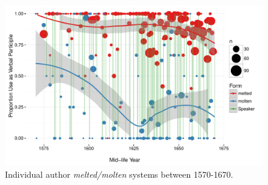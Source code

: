 \documentclass{artikel3}
\begin{document}
\begin{figure}
    \begin{center}
    \includegraphics[scale=.6]{ContextByDateAuthor1570.pdf}
    \caption{Individual author \textsl{melted/molten} systems between 1570-1670.}
       \label{molten4}
    \end{center}
\end{figure}
\end{document}
